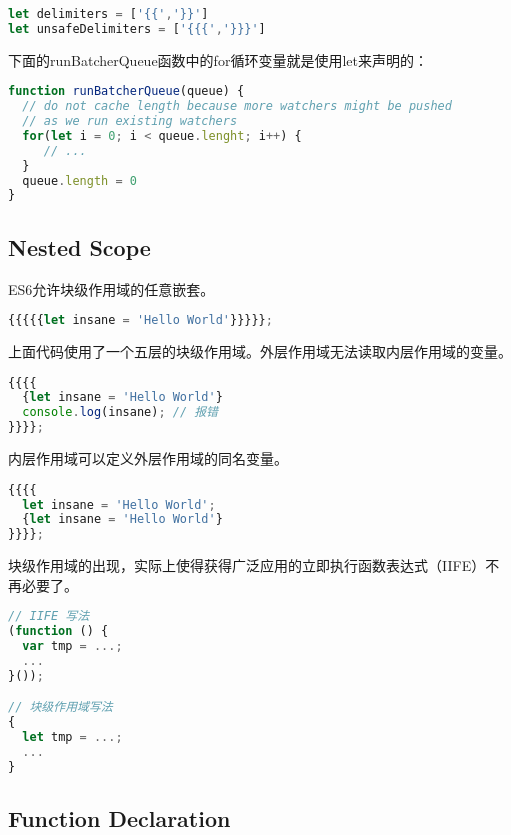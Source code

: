 \begin{lstlisting}[language=JavaScript]
let delimiters = ['{{','}}']
let unsafeDelimiters = ['{{{','}}}']
\end{lstlisting}

下面的runBatcherQueue函数中的for循环变量就是使用let来声明的：






\begin{lstlisting}[language=JavaScript]
function runBatcherQueue(queue) {
  // do not cache length because more watchers might be pushed
  // as we run existing watchers
  for(let i = 0; i < queue.lenght; i++) {
     // ...
  }
  queue.length = 0
}
\end{lstlisting}


\subsection{Nested Scope}

ES6允许块级作用域的任意嵌套。


\begin{lstlisting}[language=JavaScript]
{{{{{let insane = 'Hello World'}}}}};
\end{lstlisting}

上面代码使用了一个五层的块级作用域。外层作用域无法读取内层作用域的变量。



\begin{lstlisting}[language=JavaScript]
{{{{
  {let insane = 'Hello World'}
  console.log(insane); // 报错
}}}};
\end{lstlisting}

内层作用域可以定义外层作用域的同名变量。

\begin{lstlisting}[language=JavaScript]
{{{{
  let insane = 'Hello World';
  {let insane = 'Hello World'}
}}}};
\end{lstlisting}

块级作用域的出现，实际上使得获得广泛应用的立即执行函数表达式（IIFE）不再必要了。


\begin{lstlisting}[language=JavaScript]
// IIFE 写法
(function () {
  var tmp = ...;
  ...
}());

// 块级作用域写法
{
  let tmp = ...;
  ...
}
\end{lstlisting}


\subsection{Function Declaration}


